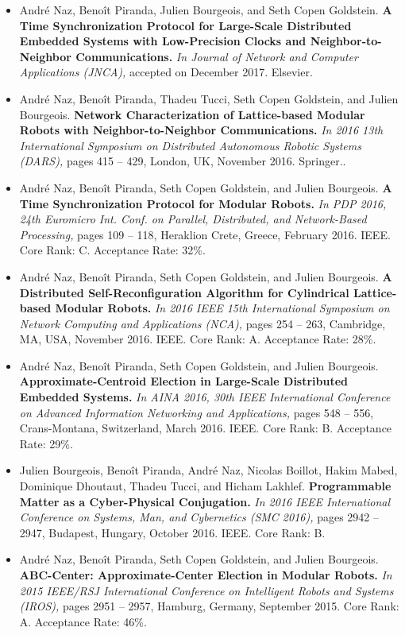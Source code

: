 {
	\vspace{-1.5cm}
	
	\renewcommand{\labelitemi}{}
	
	\newcommand{\pubEntry}[4]{
		#1. \textbf{{\color{ufcgreen}#2.}} \textit{#3,} #4. %
	}
	\begin{itemize}
		\setlength{\itemsep}{0.925\baselineskip}			
		\item \pubEntry{André Naz, Benoît Piranda, Julien Bourgeois, and Seth Copen Goldstein}{A Time Synchronization Protocol for Large-Scale Distributed Embedded Systems with Low-Precision Clocks and Neighbor-to-Neighbor Communications}{In Journal of Network and Computer Applications (JNCA)}{accepted on December 2017. Elsevier}
		\item \pubEntry{André Naz, Benoît Piranda, Thadeu Tucci, Seth Copen Goldstein, and Julien Bourgeois}{Network Characterization of Lattice-based Modular Robots with Neighbor-to-Neighbor Communications}{In 2016 13th International Symposium on Distributed Autonomous Robotic Systems (DARS)}{pages 415 -- 429, London, UK, November 2016. Springer.}
		\item \pubEntry{André Naz, Benoît Piranda, Seth Copen Goldstein, and Julien Bourgeois}{A Time Synchronization Protocol for Modular Robots}{In PDP 2016, 24th Euromicro Int. Conf. on Parallel, Distributed, and Network-Based Processing}{pages 109 -- 118, Heraklion Crete, Greece, February 2016. IEEE. Core Rank: C. Acceptance Rate: 32\%}
		\item \pubEntry{André Naz, Benoît Piranda, Seth Copen Goldstein, and Julien Bourgeois}{A Distributed Self-Reconfiguration Algorithm for Cylindrical Lattice-based Modular Robots}{In 2016 IEEE 15th International Symposium on Network Computing and Applications (NCA)}{pages 254 -- 263, Cambridge, MA, USA, November 2016. IEEE. Core Rank: A. Acceptance Rate: 28\%}
		\item \pubEntry{André Naz, Benoît Piranda, Seth Copen Goldstein, and Julien Bourgeois}{Approximate-Centroid Election in Large-Scale Distributed Embedded Systems}{ In AINA 2016, 30th IEEE International Conference on Advanced Information Networking and Applications}{pages 548 -- 556, Crans-Montana, Switzerland, March 2016. IEEE. Core Rank: B. Acceptance Rate: 29\%}
		\item \pubEntry{Julien Bourgeois, Benoît Piranda, André Naz, Nicolas Boillot, Hakim Mabed, Dominique Dhoutaut, Thadeu Tucci, and Hicham Lakhlef}{Programmable Matter as a Cyber-Physical Conjugation}{In 2016 IEEE International Conference on Systems, Man, and Cybernetics (SMC 2016)}{pages 2942 -- 2947, Budapest, Hungary, October 2016. IEEE. Core Rank: B}
		\item \pubEntry{André Naz, Benoît Piranda, Seth Copen Goldstein, and Julien Bourgeois}{ABC-Center: Approximate-Center Election in Modular Robots}{In 2015 IEEE/RSJ International Conference on Intelligent Robots and Systems (IROS)}{pages 2951 -- 2957, Hamburg, Germany, September 2015. Core Rank: A. Acceptance Rate: 46\%}
	\end{itemize}
}